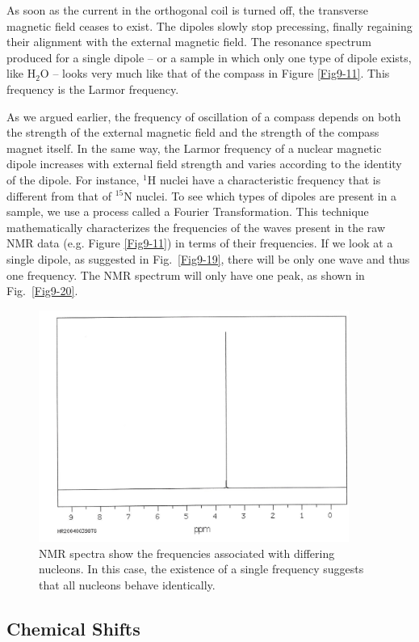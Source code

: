 As soon as the current in the orthogonal coil is turned off, the transverse magnetic field ceases to exist.  The dipoles slowly stop precessing, finally regaining their alignment with the external magnetic field.  The resonance spectrum produced for a single dipole -- or a sample in which only one type of dipole exists, like H$_2$O -- looks very much like that of the compass in Figure \ref{Fig9-11}. This frequency is the Larmor frequency.

As we argued earlier, the frequency of oscillation of a compass depends on both the strength of the external magnetic field and the strength of the compass magnet itself.  In the same way, the Larmor frequency of a nuclear magnetic dipole increases with external field strength and varies according to the identity of the dipole.  For instance, $^1$H nuclei have a characteristic frequency that is different from that of $^{15}$N nuclei.  To see which types of dipoles are present in a sample, we use a process called a Fourier Transformation.  This technique mathematically characterizes the frequencies of the waves present in the raw NMR data (e.g. Figure \ref{Fig9-11}) in terms of their frequencies.  If we look at a single dipole, as suggested in Fig.~\ref{Fig9-19}, there will be only one wave and thus one frequency. The NMR spectrum will only have one peak, as shown in Fig.~\ref{Fig9-20}.
\begin{figure}[!htb]
	\centering
	\includegraphics[width=4.0in]{./figures/Topic9/Fig9-21.jpg}
	\caption{NMR spectra show the frequencies associated with differing nucleons. In this case, the existence of a single frequency suggests that all nucleons behave identically. }
 	\label{Fig9-21}
\end{figure} 

\subsection{Chemical Shifts}

